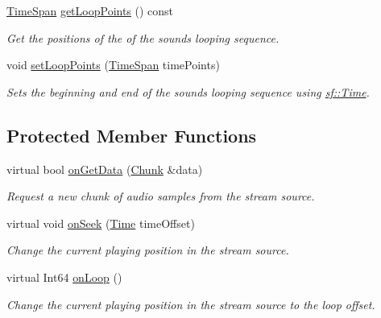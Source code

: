 \begin{DoxyCompactItemize}
\mbox{\hyperlink{structsf_1_1_music_1_1_span}{Time\+Span}} \mbox{\hyperlink{classsf_1_1_music_aae3451cad5c16ee6a6e124e62ed61361}{get\+Loop\+Points}} () const
\begin{DoxyCompactList}\small\item\em Get the positions of the of the sound\textquotesingle{}s looping sequence. \end{DoxyCompactList}\item 
void \mbox{\hyperlink{classsf_1_1_music_ae7b339f0a957dfad045f3f28083a015e}{set\+Loop\+Points}} (\mbox{\hyperlink{structsf_1_1_music_1_1_span}{Time\+Span}} time\+Points)
\begin{DoxyCompactList}\small\item\em Sets the beginning and end of the sound\textquotesingle{}s looping sequence using \mbox{\hyperlink{classsf_1_1_time}{sf\+::\+Time}}. \end{DoxyCompactList}\end{DoxyCompactItemize}
\subsection*{Protected Member Functions}
\begin{DoxyCompactItemize}
\item 
virtual bool \mbox{\hyperlink{classsf_1_1_music_aca1bcb4e5d56a854133e74bd86374463}{on\+Get\+Data}} (\mbox{\hyperlink{structsf_1_1_sound_stream_1_1_chunk}{Chunk}} \&data)
\begin{DoxyCompactList}\small\item\em Request a new chunk of audio samples from the stream source. \end{DoxyCompactList}\item 
virtual void \mbox{\hyperlink{classsf_1_1_music_a15119cc0419c16bb334fa0698699c02e}{on\+Seek}} (\mbox{\hyperlink{classsf_1_1_time}{Time}} time\+Offset)
\begin{DoxyCompactList}\small\item\em Change the current playing position in the stream source. \end{DoxyCompactList}\item 
virtual Int64 \mbox{\hyperlink{classsf_1_1_music_aa68a64bdaf5d16e9ed64f202f5c45e03}{on\+Loop}} ()
\begin{DoxyCompactList}\small\item\em Change the current playing position in the stream source to the loop offset. \end{DoxyCompactList}\end{DoxyCompactItemize}
